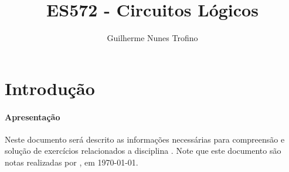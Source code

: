 \documentclass{article}
\title{ES572 - Circuitos Lógicos}
\author{Guilherme Nunes Trofino}
\begin{document}
    \maketitle
\newpage

    \tableofcontents
\newpage

    \section{Introdução}
        \paragraph{Apresentação}Neste documento será descrito as informações necessárias para compreensão e solução de exercícios relacionados a disciplina \thetitle. Note que este documento são notas realizadas por \theauthor , em \today.
\end{document}
